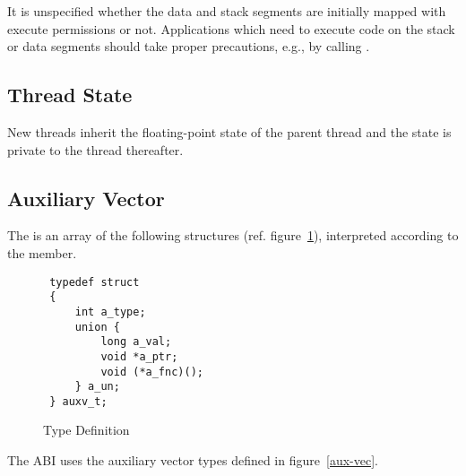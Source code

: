 It is unspecified whether 
the data and stack segments are initially mapped with
execute permissions or not.
Applications which need to execute code on the stack or data
segments should take proper precautions, e.g., by calling
.

\subsection{Thread State}

New threads inherit the floating-point state of the parent thread
and the state is private to the thread thereafter.

\subsection{Auxiliary Vector}

The  is an array of the following structures
(ref. figure~\ref{fig_auxv_t}),
interpreted according to the  member.

\begin{figure}[H]
\Hrule
\caption{ Type Definition}
\label{fig_auxv_t}
\begin{center}
\begin{verbatim}
 typedef struct
 {
     int a_type;
     union {
         long a_val;
         void *a_ptr;
         void (*a_fnc)();
     } a_un;
 } auxv_t;
\end{verbatim}
\end{center}
\Hrule
\end{figure}

The \xARCH ABI uses the auxiliary vector types defined in figure~\ref{aux-vec}.


